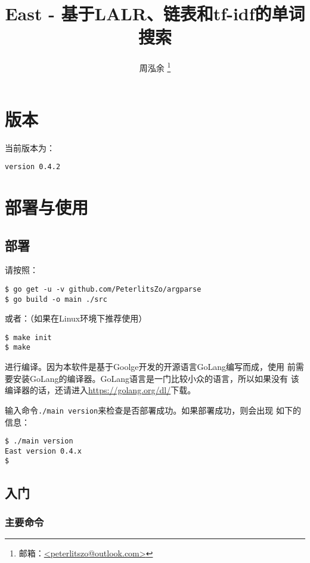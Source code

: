 \documentclass{peterlitsdoc}
\title{East - 基于LALR、链表和tf-idf的单词搜索}
\author{周泓余%
    \thanks{邮箱：\href{mailto:peterlitszo@outlook.com}
                       {<peterlitszo@outlook.com>}}%
    }
\def\go{GoLang}
\begin{document}
\maketitle
\tableofcontents
\newpage


\section{版本}

当前版本为：
\begin{lstlisting}
version 0.4.2
\end{lstlisting}


\section{部署与使用}

\subsection{部署}

请按照：
\begin{lstlisting}
$ go get -u -v github.com/PeterlitsZo/argparse
$ go build -o main ./src
\end{lstlisting}

或者：（如果在Linux环境下推荐使用）
\begin{lstlisting}
$ make init
$ make
\end{lstlisting}

进行编译。因为本软件是基于Goolge开发的开源语言\go 编写而成，使用
前需要安装\go 的编译器。\go 语言是一门比较小众的语言，所以如果没有
该编译器的话，还请进入\url{https://golang.org/dl/}下载。

输入命令\verb|./main version|来检查是否部署成功。如果部署成功，则会出现
如下的信息：
\begin{lstlisting}
$ ./main version
East version 0.4.x
$
\end{lstlisting}


\subsection{入门}

\subsubsection{主要命令}
\end{document}
